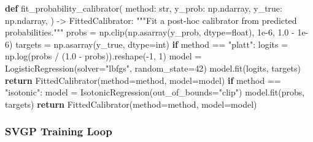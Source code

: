\documentclass[
  letterpaper,
  DIV=11,
  numbers=noendperiod]{scrartcl}
\newenvironment{Shaded}{\begin{snugshade}}{\end{snugshade}}
\newcommand{\BuiltInTok}[1]{\textcolor[rgb]{0.00,0.23,0.31}{#1}}
\newcommand{\CommentTok}[1]{\textcolor[rgb]{0.37,0.37,0.37}{#1}}
\newcommand{\ControlFlowTok}[1]{\textcolor[rgb]{0.00,0.23,0.31}{\textbf{#1}}}
\newcommand{\DecValTok}[1]{\textcolor[rgb]{0.68,0.00,0.00}{#1}}
\newcommand{\FloatTok}[1]{\textcolor[rgb]{0.68,0.00,0.00}{#1}}
\newcommand{\KeywordTok}[1]{\textcolor[rgb]{0.00,0.23,0.31}{\textbf{#1}}}
\newcommand{\NormalTok}[1]{\textcolor[rgb]{0.00,0.23,0.31}{#1}}
\newcommand{\OperatorTok}[1]{\textcolor[rgb]{0.37,0.37,0.37}{#1}}
\newcommand{\StringTok}[1]{\textcolor[rgb]{0.13,0.47,0.30}{#1}}
\begin{document}
\begin{Shaded}
\begin{Highlighting}[]
\KeywordTok{def}\NormalTok{ fit\_probability\_calibrator(}
\NormalTok{    method: }\BuiltInTok{str}\NormalTok{,}
\NormalTok{    y\_prob: np.ndarray,}
\NormalTok{    y\_true: np.ndarray,}
\NormalTok{) }\OperatorTok{{-}\textgreater{}}\NormalTok{ FittedCalibrator:}
    \CommentTok{"""Fit a post{-}hoc calibrator from predicted probabilities."""}
\NormalTok{    probs }\OperatorTok{=}\NormalTok{ np.clip(np.asarray(y\_prob, dtype}\OperatorTok{=}\BuiltInTok{float}\NormalTok{), }\FloatTok{1e{-}6}\NormalTok{, }\FloatTok{1.0} \OperatorTok{{-}} \FloatTok{1e{-}6}\NormalTok{)}
\NormalTok{    targets }\OperatorTok{=}\NormalTok{ np.asarray(y\_true, dtype}\OperatorTok{=}\BuiltInTok{int}\NormalTok{)}
    \ControlFlowTok{if}\NormalTok{ method }\OperatorTok{==} \StringTok{"platt"}\NormalTok{:}
\NormalTok{        logits }\OperatorTok{=}\NormalTok{ np.log(probs }\OperatorTok{/}\NormalTok{ (}\FloatTok{1.0} \OperatorTok{{-}}\NormalTok{ probs)).reshape(}\OperatorTok{{-}}\DecValTok{1}\NormalTok{, }\DecValTok{1}\NormalTok{)}
\NormalTok{        model }\OperatorTok{=}\NormalTok{ LogisticRegression(solver}\OperatorTok{=}\StringTok{"lbfgs"}\NormalTok{, random\_state}\OperatorTok{=}\DecValTok{42}\NormalTok{)}
\NormalTok{        model.fit(logits, targets)}
        \ControlFlowTok{return}\NormalTok{ FittedCalibrator(method}\OperatorTok{=}\NormalTok{method, model}\OperatorTok{=}\NormalTok{model)}
    \ControlFlowTok{if}\NormalTok{ method }\OperatorTok{==} \StringTok{"isotonic"}\NormalTok{:}
\NormalTok{        model }\OperatorTok{=}\NormalTok{ IsotonicRegression(out\_of\_bounds}\OperatorTok{=}\StringTok{"clip"}\NormalTok{)}
\NormalTok{        model.fit(probs, targets)}
        \ControlFlowTok{return}\NormalTok{ FittedCalibrator(method}\OperatorTok{=}\NormalTok{method, model}\OperatorTok{=}\NormalTok{model)}
\end{Highlighting}
\end{Shaded}

\subsubsection{SVGP Training Loop}\label{sec-credit-risk-svgp-snippet}
\end{document}
